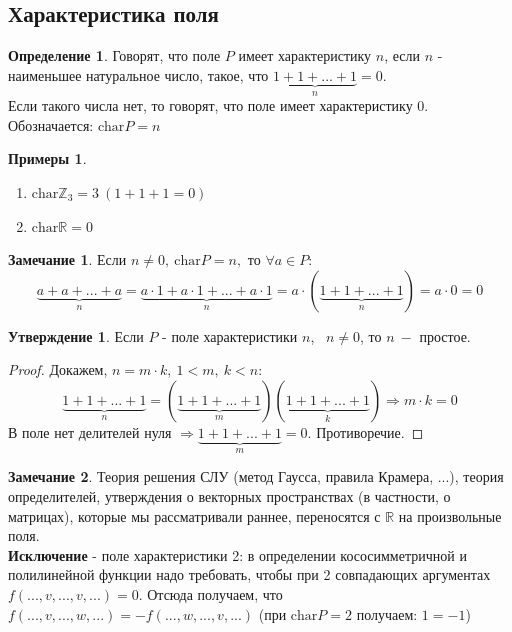\documentclass[a4paper, 12pt]{article}
\newcommand{\R}{\mathbb R}
\newcommand{\Z}{\mathbb Z}
\newcommand\tab[1][.5cm]{\hspace*{#1}}
\theoremstyle{definition}
\newtheorem*{definition}{Определение}
\newtheorem*{subtheorem}{Утверждение}
\newtheorem*{remark}{Замечание}
\newtheorem*{example}{Примеры}
\begin{document}
  \subsection{Характеристика поля}
  \begin{definition}
    Говорят, что поле $P$ имеет характеристику $n$, если $n$ - наименьшее натуральное число, такое, что $\underbrace{1 + 1 + ... + 1}_{n} = 0 $. \\
    Если такого числа нет, то говорят, что поле имеет характеристику 0.\\
    Обозначается: $\textrm{char}P=n$ 
  \end{definition} 
  \begin{example} \tab
    \begin{enumerate}
      \item $\textrm{char}\Z_3 = 3 \ (1 + 1 + 1 = 0)$
      \item $\textrm{char}\R = 0$  
    \end{enumerate}
  \end{example}
  \begin{remark}
    Если $n \neq 0, \ \textrm{char}P = n, $ то $\forall a \in P:$ 
    $$ \underbrace{a+a+...+a}_{n} = \underbrace{a\cdot 1+a\cdot 1+...+a\cdot 1}_{n} = a\cdot (\underbrace{1+1+...+1}_{n}) = a \cdot 0 =0 $$ 
  \end{remark} 
  \begin{subtheorem}
    Если $P$ - поле характеристики $n$, \ $n \neq 0$, то $n \ -$ простое. 
  \end{subtheorem} 
  \begin{proof}
    Докажем, $n=m\cdot k, \ 1<m, \ k<n$:
    $$\underbrace{1+1+...+1}_{n} = (\underbrace{1+1+...+1}_{m})(\underbrace{1+1+...+1}_{k})\Longrightarrow m \cdot k=0$$  
    В поле нет делителей нуля $\Longrightarrow \underbrace{1+1+...+1}_{m} = 0$. Противоречие.
  \end{proof}
  \begin{remark}
    Теория решения СЛУ (метод Гаусса, правила Крамера, ...), теория определителей, утверждения о векторных пространствах (в частности, о матрицах), которые мы рассматривали раннее, переносятся с $\R$ на произвольные поля. \\
    \textbf{Исключение}  - поле характеристики 2: в определении кососимметричной и полилинейной функции надо требовать, чтобы при 2 совпадающих аргументах \\ $f(...,v,...,v,...)=0$. Отсюда получаем, что $f(...,v,...,w,...) = -f(...,w,...,v,...)$ (при $\textrm{char}P = 2$ получаем: $1 = -1$)  
  \end{remark}
\end{document}

